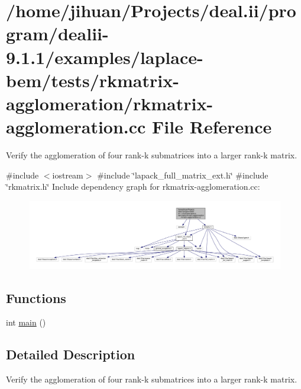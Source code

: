 \hypertarget{rkmatrix-agglomeration_8cc}{}\section{/home/jihuan/\+Projects/deal.ii/program/dealii-\/9.1.1/examples/laplace-\/bem/tests/rkmatrix-\/agglomeration/rkmatrix-\/agglomeration.cc File Reference}
\label{rkmatrix-agglomeration_8cc}


Verify the agglomeration of four rank-\/k submatrices into a larger rank-\/k matrix.  


{\ttfamily \#include $<$iostream$>$}\newline
{\ttfamily \#include \char`\"{}lapack\+\_\+full\+\_\+matrix\+\_\+ext.\+h\char`\"{}}\newline
{\ttfamily \#include \char`\"{}rkmatrix.\+h\char`\"{}}\newline
Include dependency graph for rkmatrix-\/agglomeration.cc\+:\nopagebreak
\begin{figure}[H]
\begin{center}
\leavevmode
\includegraphics[width=350pt]{rkmatrix-agglomeration_8cc__incl}
\end{center}
\end{figure}
\subsection*{Functions}
\begin{DoxyCompactItemize}
\item 
int \hyperlink{rkmatrix-agglomeration_8cc_ae66f6b31b5ad750f1fe042a706a4e3d4}{main} ()
\end{DoxyCompactItemize}


\subsection{Detailed Description}
Verify the agglomeration of four rank-\/k submatrices into a larger rank-\/k matrix. 

